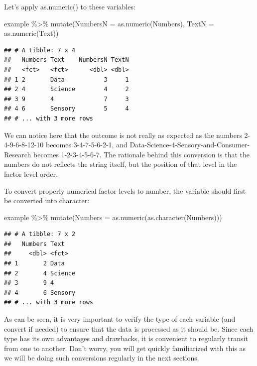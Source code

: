 \documentclass[
]{krantz}
\makeatletter
\newenvironment{Shaded}{\begin{snugshade}}{\end{snugshade}}
\newcommand{\AttributeTok}[1]{\textcolor[rgb]{0.61,0.61,0.61}{#1}}
\newcommand{\FunctionTok}[1]{\textcolor[rgb]{0,0,0}{#1}}
\newcommand{\NormalTok}[1]{#1}
\newcommand{\SpecialCharTok}[1]{\textcolor[rgb]{0,0,0}{#1}}
\newenvironment{kframe}{%
\medskip{}
\setlength{\fboxsep}{.8em}
 \def\at@end@of@kframe{}%
 \ifinner\ifhmode%
  \def\at@end@of@kframe{\end{minipage}}%
  \begin{minipage}{\columnwidth}%
 \fi\fi%
 \def\FrameCommand##1{\hskip\@totalleftmargin \hskip-\fboxsep
 \colorbox{shadecolor}{##1}\hskip-\fboxsep
     \hskip-\linewidth \hskip-\@totalleftmargin \hskip\columnwidth}%
 \MakeFramed {\advance\hsize-\width
   \@totalleftmargin\z@ \linewidth\hsize
   \@setminipage}}%
 {\par\unskip\endMakeFramed%
 \at@end@of@kframe}
\renewenvironment{Shaded}{\begin{kframe}}{\end{kframe}}
\makeatother
\begin{document}
Let's apply as.numeric() to these variables:

\begin{Shaded}
\begin{Highlighting}[]
\NormalTok{example }\SpecialCharTok{\%\textgreater{}\%} 
  \FunctionTok{mutate}\NormalTok{(}\AttributeTok{NumbersN =} \FunctionTok{as.numeric}\NormalTok{(Numbers), }\AttributeTok{TextN =} \FunctionTok{as.numeric}\NormalTok{(Text))}
\end{Highlighting}
\end{Shaded}

\begin{verbatim}
## # A tibble: 7 x 4
##   Numbers Text    NumbersN TextN
##   <fct>   <fct>      <dbl> <dbl>
## 1 2       Data           3     1
## 2 4       Science        4     2
## 3 9       4              7     3
## 4 6       Sensory        5     4
## # ... with 3 more rows
\end{verbatim}

We can notice here that the outcome is not really as expected as the numbers 2-4-9-6-8-12-10 becomes 3-4-7-5-6-2-1, and Data-Science-4-Sensory-and-Consumer-Research becomes 1-2-3-4-5-6-7. The rationale behind this conversion is that the numbers do not reflects the string itself, but the position of that level in the factor level order.

To convert properly numerical factor levels to number, the variable should first be converted into character:

\begin{Shaded}
\begin{Highlighting}[]
\NormalTok{example }\SpecialCharTok{\%\textgreater{}\%}
  \FunctionTok{mutate}\NormalTok{(}\AttributeTok{Numbers =} \FunctionTok{as.numeric}\NormalTok{(}\FunctionTok{as.character}\NormalTok{(Numbers)))}
\end{Highlighting}
\end{Shaded}

\begin{verbatim}
## # A tibble: 7 x 2
##   Numbers Text   
##     <dbl> <fct>  
## 1       2 Data   
## 2       4 Science
## 3       9 4      
## 4       6 Sensory
## # ... with 3 more rows
\end{verbatim}

As can be seen, it is very important to verify the type of each variable (and convert if needed) to ensure that the data is processed as it should be. Since each type has its own advantages and drawbacks, it is convenient to regularly transit from one to another. Don't worry, you will get quickly familiarized with this as we will be doing such conversions regularly in the next sections.
\end{document}
